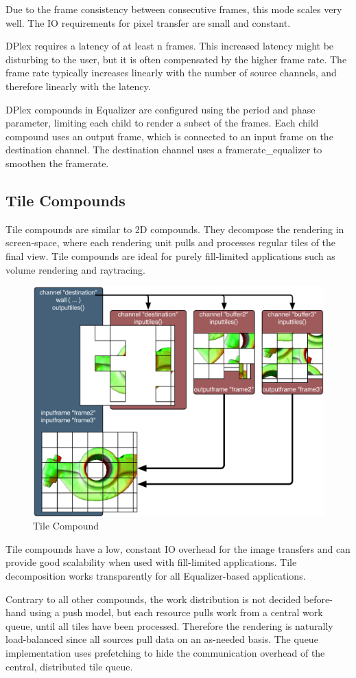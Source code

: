 \documentclass[10pt,a4]{scrartcl}
\begin{document}
Due to the frame consistency between consecutive frames, this mode scales
very well. The IO requirements for pixel transfer are small and
constant.

DPlex requires a latency of at least n frames. This increased latency
might be disturbing to the user, but it is often compensated by the
higher frame rate. The frame rate typically increases linearly with the
number of source channels, and therefore linearly with the latency.

DPlex compounds in Equalizer are configured using the \textsf{period}
and \textsf{phase} parameter, limiting each child to render a subset of
the frames. Each child compound uses an output frame, which is connected
to an input frame on the destination channel. The destination channel
uses a \textsf{framerate\_equalizer} to smoothen the framerate.


\subsection{\label{sTileCompunds}Tile Compounds}

Tile compounds are similar to 2D compounds. They decompose the rendering in
screen-space, where each rendering unit pulls and processes regular tiles of the
final view. Tile compounds are ideal for purely fill-limited applications such
as volume rendering and raytracing.

\begin{figure}
  \includegraphics[width=.618\textwidth]{images/tile.pdf}
  {\caption{\label{fTile}Tile Compound}}
\end{figure}
Tile compounds have a low, constant IO overhead for the image transfers and can
provide good scalability when used with fill-limited applications. Tile
decomposition works transparently for all Equalizer-based applications.

Contrary to all other compounds, the work distribution is not decided
before-hand using a push model, but each resource pulls work from a central work
queue, until all tiles have been processed. Therefore the rendering is naturally
load-balanced since all sources pull data on an as-needed basis. The queue
implementation uses prefetching to hide the communication overhead of the
central, distributed tile queue.
\end{document}

